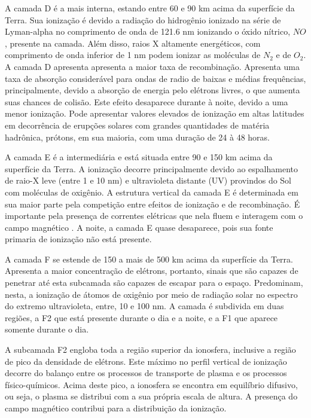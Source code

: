 A camada D é a mais interna, estando entre 60 e 90 km acima da superfície da Terra. Sua ionização é devido a radiação do hidrogênio ionizado na série de Lyman-alpha no comprimento de onda de 121.6 nm ionizando o óxido nítrico, $NO$, presente na camada. Além disso, raios X altamente energéticos, com comprimento de onda inferior de 1 nm podem ionizar as moléculas de $N_2$ e de $O_2$. A camada D apresenta apresenta a maior taxa de recombinação. Apresenta uma taxa de absorção considerável para ondas de radio de baixas e médias frequências, principalmente, devido a absorção de energia pelo elétrons livres, o que aumenta suas chances de colisão. Este efeito desaparece durante à noite, devido a uma menor ionização. Pode apresentar valores elevados de ionização em altas latitudes em decorrência de erupções solares com grandes quantidades de matéria hadrônica, prótons, em sua maioria, com uma duração de 24 à 48 horas.

A camada E é a intermediária e está situada entre 90 e 150 km acima da superfície da Terra. A ionização decorre principalmente devido ao espalhamento de raio-X leve (entre 1 e 10 nm) e ultravioleta distante (UV) provindos do Sol com moléculas de oxigênio. A estrutura vertical da camada E é determinada em sua maior parte pela competição entre efeitos de ionização e de recombinação. É importante pela presença de correntes elétricas que nela fluem e interagem com o campo magnético \cite{KIRCHHOFF:1991}. A noite, a camada E quase desaparece, pois sua fonte primaria de ionização não está presente.

A camada F se estende de 150 a mais de 500 km acima da superfície da Terra. Apresenta a maior concentração de elétrons, portanto, sinais que são capazes de penetrar até esta subcamada são capazes de escapar para o espaço. Predominam, nesta, a ionização de átomos de oxigênio por meio de radiação solar no espectro do extremo ultravioleta, entre, 10 e 100 nm. A camada é subdivida em duas regiões, a F2 que está presente durante o dia e a noite, e a F1 que aparece somente durante o dia. 

A subcamada F2 engloba toda a região superior da ionosfera, inclusive a região de pico da densidade de elétrons. Este máximo no perfil vertical de ionização decorre do balanço entre os processos de transporte de plasma e os processos físico-químicos. Acima deste pico, a ionosfera se encontra em equilíbrio difusivo, ou seja, o plasma se distribui com a sua própria escala de altura. A presença do campo magnético contribui para a distribuição da ionização.

